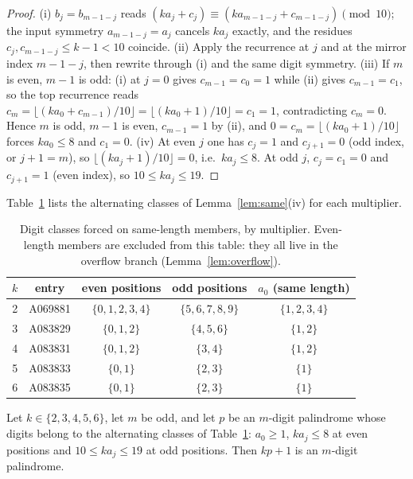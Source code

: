 \begin{proof}
(i) $b_j = b_{m-1-j}$ reads
$(k a_j + c_j) \equiv (k a_{m-1-j} + c_{m-1-j})
\pmod{10}$; the input symmetry $a_{m-1-j} = a_j$ cancels
$k a_j$ exactly, and the residues
$c_j, c_{m-1-j} \le k-1 < 10$ coincide. (ii) Apply the
recurrence at $j$ and at the mirror index $m-1-j$, then
rewrite through (i) and the same digit symmetry. (iii) If
$m$ is even, $m-1$ is odd: (i) at $j = 0$ gives
$c_{m-1} = c_0 = 1$ while (ii) gives $c_{m-1} = c_1$, so
the top recurrence reads
$c_m = \lfloor(k a_0 + c_{m-1})/10\rfloor
= \lfloor(k a_0 + 1)/10\rfloor = c_1 = 1$,
contradicting $c_m = 0$. Hence $m$ is odd, $m-1$ is
even, $c_{m-1} = 1$ by (ii), and
$0 = c_m = \lfloor(k a_0 + 1)/10\rfloor$ forces
$k a_0 \le 8$ and $c_1 = 0$. (iv) At even $j$ one has
$c_j = 1$ and $c_{j+1} = 0$ (odd index, or $j+1 = m$), so
$\lfloor(k a_j + 1)/10\rfloor = 0$, i.e.\ $k a_j \le 8$.
At odd $j$, $c_j = c_1 = 0$ and $c_{j+1} = 1$ (even
index), so $10 \le k a_j \le 19$.
\end{proof}

Table~\ref{tab:classes} lists the alternating classes of
Lemma~\ref{lem:same}(iv) for each multiplier.

\begin{table}[ht]
\centering
\small
\begin{tabular}{c|c|c|c|c}
\hline
$k$ & entry & even positions & odd positions &
$a_0$ (same length) \\
\hline
2 & A069881 & $\{0,1,2,3,4\}$ & $\{5,6,7,8,9\}$ &
$\{1,2,3,4\}$ \\
3 & A083829 & $\{0,1,2\}$ & $\{4,5,6\}$ & $\{1,2\}$ \\
4 & A083831 & $\{0,1,2\}$ & $\{3,4\}$ & $\{1,2\}$ \\
5 & A083833 & $\{0,1\}$ & $\{2,3\}$ & $\{1\}$ \\
6 & A083835 & $\{0,1\}$ & $\{2,3\}$ & $\{1\}$ \\
\hline
\end{tabular}
\caption{Digit classes forced on same-length members, by
multiplier. Even-length members are excluded from this
table: they all live in the overflow branch
(Lemma~\ref{lem:overflow}).}
\label{tab:classes}
\end{table}

\begin{lemma}
\label{lem:altsuff}
Let $k \in \{2,3,4,5,6\}$, let $m$ be odd, and let $p$ be
an $m$-digit palindrome whose digits belong to the
alternating classes of Table~\ref{tab:classes}: $a_0 \ge
1$, $k a_j \le 8$ at even positions and
$10 \le k a_j \le 19$ at odd positions. Then $kp+1$ is an
$m$-digit palindrome.
\end{lemma}

